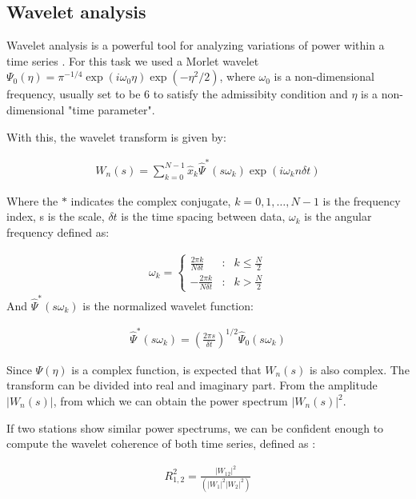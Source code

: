 \subsection{Wavelet analysis}

Wavelet analysis is a powerful tool for analyzing variations of power within a time series \citep{Torrence:1998}. For this task we used a Morlet wavelet $\Psi_0(\eta) = \pi^{-1/4}\exp(i\omega_0\eta)\exp(-\eta^2/2)$, where $\omega_0$ is a non-dimensional frequency, usually set to be 6 to satisfy the admissibity condition \citep{Farge:1992} and $\eta$ is a non-dimensional "time parameter".

With this, the wavelet transform is given by:

\begin{align}
W_n(s) = \sum_{k=0}^{N-1}\hat{x}_k\hat{\Psi}^*\left(s\omega_k\right)\exp(i\omega_k n\delta t)
\end{align}  

Where the $*$ indicates the complex conjugate, $k=0, 1, \ldots, N-1$ is the frequency index, s is the scale, $\delta t$ is the time spacing between data, $\omega_k$ is the angular frequency defined as:

\begin{align}
  \omega_k = \left\lbrace
  \begin{array}{ccc}
    \frac{2\pi k}{N\delta t} & : & k\leq \frac{N}{2} \\
    -\frac{2\pi k}{N\delta t} & : & k > \frac{N}{2} 
  \end{array}
  \right.
\end{align}
And $\hat{\Psi}^*\left(s\omega_k\right)$ is the normalized wavelet function:

\begin{align}
  \hat{\Psi}^*\left(s\omega_k\right) = \left( \frac{2\pi s}{\delta t}\right)^{1/2} \hat{\Psi}_0\left(s\omega_k\right)
\end{align}

Since $\Psi(\eta)$ is a complex function, is expected that $W_n(s)$ is also complex. The transform can be divided into real and imaginary part. From the amplitude $|W_n(s)|$, from which we can obtain the power spectrum $|W_n(s)|^2$.

If two stations show similar power spectrums, we can be confident enough to compute the wavelet coherence of both time series, defined as \citep{Yang:2011}:

\begin{align}
  R^2_{1,2}=\frac{|W_{12}|^2}{\left(|W_1|^2|W_2|^2\right)}
\end{align}

